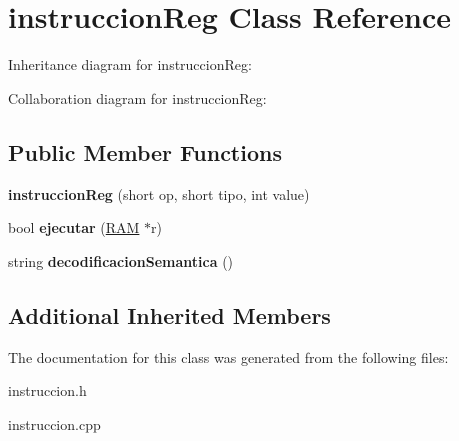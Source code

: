 \hypertarget{classinstruccionReg}{}\section{instruccion\+Reg Class Reference}
\label{classinstruccionReg}


Inheritance diagram for instruccion\+Reg\+:


Collaboration diagram for instruccion\+Reg\+:
\subsection*{Public Member Functions}
\begin{DoxyCompactItemize}
\item 
\hypertarget{classinstruccionReg_a70bb970e934ed5914e7af48c952ca38c}{}{\bfseries instruccion\+Reg} (short op, short tipo, int value)\label{classinstruccionReg_a70bb970e934ed5914e7af48c952ca38c}

\item 
\hypertarget{classinstruccionReg_a52491871a0ec86b200b1f3ecb94f499e}{}bool {\bfseries ejecutar} (\hyperlink{classRAM}{R\+A\+M} $\ast$r)\label{classinstruccionReg_a52491871a0ec86b200b1f3ecb94f499e}

\item 
\hypertarget{classinstruccionReg_a7dbe4a4226116fa37eba79c6401e6073}{}string {\bfseries decodificacion\+Semantica} ()\label{classinstruccionReg_a7dbe4a4226116fa37eba79c6401e6073}

\end{DoxyCompactItemize}
\subsection*{Additional Inherited Members}


The documentation for this class was generated from the following files\+:\begin{DoxyCompactItemize}
\item 
instruccion.\+h\item 
instruccion.\+cpp\end{DoxyCompactItemize}
